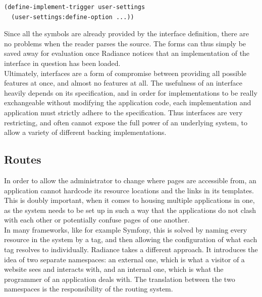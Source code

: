 \documentclass{sig-alternate}
\begin{document}
\begin{verbatim}
(define-implement-trigger user-settings
  (user-settings:define-option ...))
\end{verbatim}

Since all the symbols are already provided by the interface definition, there are no problems when the reader parses the source. The forms can thus simply be saved away for evaluation once Radiance notices that an implementation of the interface in question has been loaded. \\

Ultimately, interfaces are a form of compromise between providing all possible features at once, and almost no features at all. The usefulness of an interface heavily depends on its specification, and in order for implementations to be really exchangeable without modifying the application code, each implementation and application must strictly adhere to the specification. Thus interfaces are very restricting, and often cannot expose the full power of an underlying system, to allow a variety of different backing implementations.

\subsection{Routes}
In order to allow the administrator to change where pages are accessible from, an application cannot hardcode its resource locations and the links in its templates. This is doubly important, when it comes to housing multiple applications in one, as the system needs to be set up in such a way that the applications do not clash with each other or potentially confuse pages of one another. \\

In many frameworks, like for example Symfony\cite{symfony}, this is solved by naming every resource in the system by a tag, and then allowing the configuration of what each tag resolves to individually. Radiance takes a different approach. It introduces the idea of two separate namespaces: an external one, which is what a visitor of a website sees and interacts with, and an internal one, which is what the programmer of an application deals with. The translation between the two namespaces is the responsibility of the routing system. \\
\end{document}
